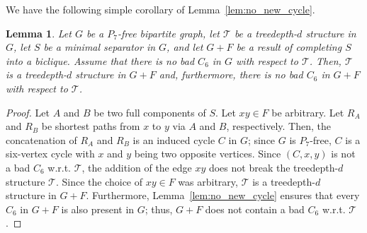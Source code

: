 \documentclass[11pt,a4paper]{article}
\newtheorem{lemma}[theorem]{Lemma}
\theoremstyle{definition}
\def\T{\mathcal{T}}
\begin{document}
We have the following simple corollary of Lemma~\ref{lem:no_new_cycle}.
\begin{lemma}\label{lem:bip_T_stays}
    Let $G$ be a $P_7$-free bipartite graph, let $\T$ be a treedepth-$d$ structure in $G$,
    let $S$ be a minimal separator in $G$, and let $G+F$ be a result of completing 
    $S$ into a biclique.
    Assume that there is no bad $C_6$ in $G$ with respect to $\T$.
    Then, $\T$ is a treedepth-$d$ structure in $G+F$ and, furthermore, 
    there is no bad $C_6$ in $G+F$ with respect to $\T$.
\end{lemma}
\begin{proof}
    Let $A$ and $B$ be two full components of $S$.     
    Let $xy \in F$ be arbitrary. Let $R_A$ and $R_B$ be shortest paths from $x$ to $y$ via $A$ and $B$,
    respectively. Then, the concatenation of $R_A$ and $R_B$ is an induced cycle $C$ in $G$;
    since $G$ is $P_7$-free, $C$ is a six-vertex cycle with $x$ and $y$ being two opposite vertices. 
    Since $(C,x,y)$ is not a bad $C_6$ w.r.t. $\T$, the addition of the edge $xy$
    does not break the treedepth-$d$ structure $\T$. Since the choice of $xy \in F$ was
    arbitrary, $\T$ is a treedepth-$d$ structure in $G+F$. 
    Furthermore, Lemma~\ref{lem:no_new_cycle} ensures that every $C_6$ in $G+F$ is also present
    in $G$; thus, $G+F$ does not contain a bad $C_6$ w.r.t. $\T$. 
\end{proof}
\end{document}
